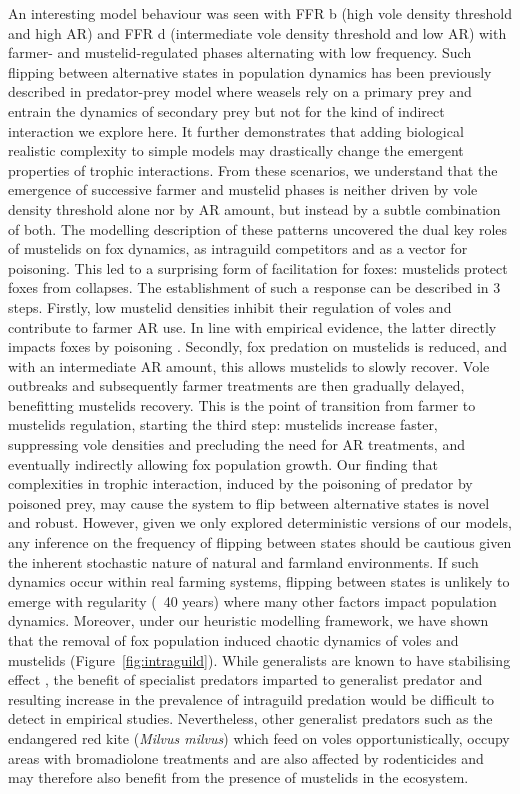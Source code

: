 \documentclass[11pt]{article}
\begin{document}
An interesting model behaviour was seen with FFR b (high vole density threshold and high AR) and FFR d (intermediate vole density threshold and low AR) with farmer- and mustelid-regulated phases alternating with low frequency. Such flipping between alternative states in population dynamics has been previously described in predator-prey model where weasels rely on a primary prey and entrain the dynamics of secondary prey \citep{Hanski1996} but not for the kind of indirect interaction we explore here. It further demonstrates that adding biological realistic complexity to simple models may drastically change the emergent properties of trophic interactions.
From these scenarios, we understand that the emergence of successive farmer and mustelid phases is neither driven by vole density threshold alone nor by AR amount, but instead by a subtle combination of both. The modelling description of these patterns uncovered the dual key roles of mustelids on fox dynamics, as intraguild competitors and as a vector for poisoning. This led to a surprising form of facilitation for foxes: mustelids protect foxes from collapses. The establishment of such a response can be described in 3 steps. Firstly, low mustelid densities inhibit their regulation of voles and contribute to farmer AR use. In line with empirical evidence, the latter directly impacts foxes by poisoning \citep{Jacquot2013}. Secondly, fox predation on mustelids is reduced, and with an intermediate AR amount, this allows mustelids to slowly recover. Vole outbreaks and subsequently farmer treatments are then gradually delayed, benefitting mustelids recovery. This is the point of transition from farmer to mustelids regulation, starting the third step: mustelids increase faster, suppressing vole densities and precluding the need for AR treatments, and eventually indirectly allowing fox population growth. Our finding that complexities in trophic interaction, induced by the poisoning of predator by poisoned prey, may cause the system to flip between alternative states is novel and robust. However, given we only explored deterministic versions of our models, any inference on the frequency of flipping between states should be cautious given the inherent stochastic nature of natural and farmland environments. If such dynamics occur within real farming systems, flipping between states is unlikely to emerge with regularity (~40 years) where many other factors impact population dynamics. Moreover, under our heuristic modelling framework, we have shown that the removal of fox population induced chaotic dynamics of voles and mustelids (Figure~\ref{fig:intraguild}). While generalists are known to have stabilising effect \citep{Hanski1991}, the benefit of specialist predators imparted to generalist predator and resulting increase in the prevalence of intraguild predation would be difficult to detect in empirical studies. Nevertheless, other generalist predators such as the endangered red kite (\textit{Milvus milvus}) which feed on voles opportunistically, occupy areas with bromadiolone treatments and are also affected by rodenticides \citep{Coeurdassier2014} and may therefore also benefit from the presence of mustelids in the ecosystem.
\end{document}
